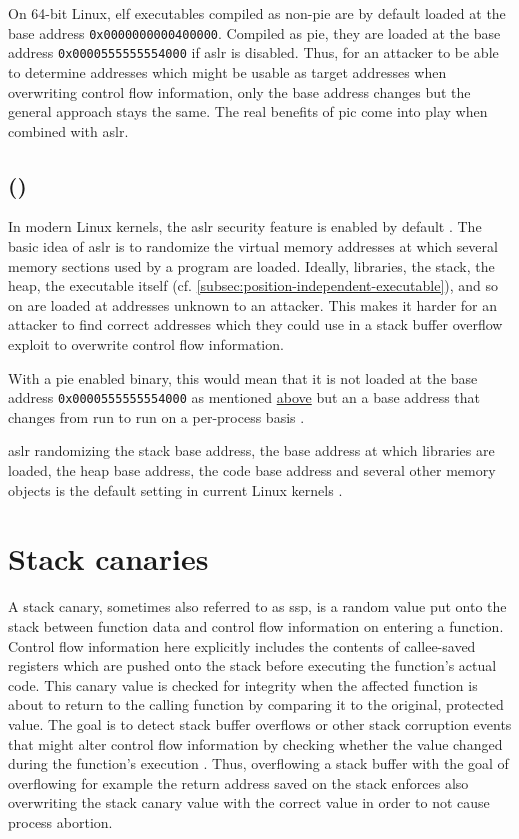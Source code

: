 On 64-bit Linux, \gls{elf} executables compiled as non-\acs{pie} are by default loaded at the base address \texttt{0x0000000000400000}.
Compiled as \gls{pie}, they are loaded at the base address \texttt{0x0000555555554000} if \gls{aslr} is disabled.
Thus, for an attacker to be able to determine addresses which might be usable as target addresses when overwriting control flow information, only the base address changes but the general approach stays the same.
The real benefits of \gls{pic} come into play when combined with \gls{aslr}.

\subsection{ ()}
\label{subsec:address-space-layout-randomization}

In modern Linux kernels, the \gls{aslr} security feature is enabled by default \cite{Boelen2018}.
The basic idea of \gls{aslr} is to randomize the virtual memory addresses at which several memory sections used by a program are loaded.
Ideally, libraries, the stack, the heap, the executable itself (cf. \cref{subsec:position-independent-executable}), and so on are loaded at addresses unknown to an attacker.
This makes it harder for an attacker to find correct addresses which they could use in a stack buffer overflow exploit to overwrite control flow information.

With a \gls{pie} enabled binary, this would mean that it is not loaded at the base address \texttt{0x0000555555554000} as mentioned \hyperref[subsec:position-independent-executable]{above} but an a base address that changes from run to run on a per-process basis \cite{MarcoGisbert2014}.

\gls{aslr} randomizing the stack base address, the base address at which libraries are loaded, the heap base address, the code base address and several other memory objects is the default setting in current Linux kernels \cites{Boelen2018,Kernel2020a}[14]{OracleCorporation2020}.

\section{Stack canaries}
\label{sec:stack-canaries}

A stack canary, sometimes also referred to as \gls{ssp}, is a random value put onto the stack between function data and control flow information on entering a function.
Control flow information here explicitly includes the contents of callee-saved registers which are pushed onto the stack before executing the function's actual code.
This canary value is checked for integrity when the affected function is about to return to the calling function by comparing it to the original, protected value.
The goal is to detect stack buffer overflows or other stack corruption events that might alter control flow information by checking whether the value changed during the function's execution \cites[2]{Bierbaumer2018}{FSF2019}.
Thus, overflowing a stack buffer with the goal of overflowing for example the return address saved on the stack enforces also overwriting the stack canary value with the correct value in order to not cause process abortion.

